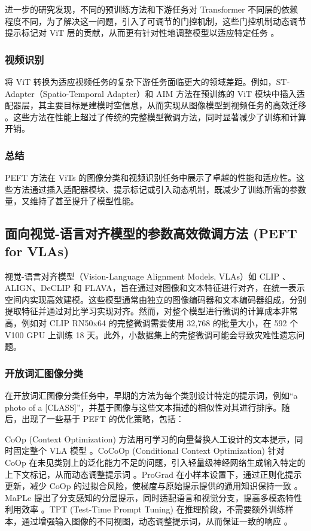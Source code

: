 \documentclass[12pt,a4paper,twoside]{article} %
\begin{document}
\begin{multicols}{2}
进一步的研究发现，不同的预训练方法和下游任务对 Transformer 不同层的依赖程度不同，为了解决这一问题，引入了可调节的门控机制，这些门控机制动态调节提示标记对 ViT 层的贡献，从而更有针对性地调整模型以适应特定任务 \cite{dynamic_gate}。

\subsubsection{视频识别}
将 ViT 转换为适应视频任务的复杂下游任务面临更大的领域差距。例如，ST-Adapter（Spatio-Temporal Adapter）和 AIM 方法在预训练的 ViT 模块中插入适配器层，其主要目标是建模时空信息，从而实现从图像模型到视频任务的高效迁移 \cite{st_adapter, aim}。这些方法在性能上超过了传统的完整模型微调方法，同时显著减少了训练和计算开销。

\subsubsection{总结}
PEFT 方法在 ViTs 的图像分类和视频识别任务中展示了卓越的性能和适应性。这些方法通过插入适配器模块、提示标记或引入动态机制，既减少了训练所需的参数量，又维持了甚至提升了模型性能。


\subsection{面向视觉-语言对齐模型的参数高效微调方法 (PEFT for VLAs)}

视觉-语言对齐模型（Vision-Language Alignment Models, VLAs）如 CLIP \cite{clip}、ALIGN、DeCLIP 和 FLAVA，旨在通过对图像和文本特征进行对齐，在统一表示空间内实现高效建模。这些模型通常由独立的图像编码器和文本编码器组成，分别提取特征并通过对比学习实现对齐。然而，对整个模型进行微调的计算成本非常高，例如对 CLIP RN50x64 的完整微调需要使用 32,768 的批量大小，在 592 个 V100 GPU 上训练 18 天。此外，小数据集上的完整微调可能会导致灾难性遗忘问题。

\subsubsection{开放词汇图像分类}
在开放词汇图像分类任务中，早期的方法为每个类别设计特定的提示词，例如“a photo of a [CLASS]”，并基于图像与这些文本描述的相似性对其进行排序。随后，出现了一些基于 PEFT 的优化策略，包括：

CoOp (Context Optimization) 方法用可学习的向量替换人工设计的文本提示，同时固定整个 VLA 模型 \cite{coop}。CoCoOp (Conditional Context Optimization) 针对 CoOp 在未见类别上的泛化能力不足的问题，引入轻量级神经网络生成输入特定的上下文标记，从而动态调整提示词 \cite{cocoop}。ProGrad 在小样本设置下，通过正则化提示更新，减少 CoOp 的过拟合风险，使梯度与原始提示提供的通用知识保持一致 \cite{prograd}。MaPLe 提出了分支感知的分层提示，同时适配语言和视觉分支，提高多模态特性利用效率 \cite{maple}。TPT (Test-Time Prompt Tuning) 在推理阶段，不需要额外训练样本，通过增强输入图像的不同视图，动态调整提示词，从而保证一致的响应 \cite{tpt}。


\end{multicols}
\end{document}
